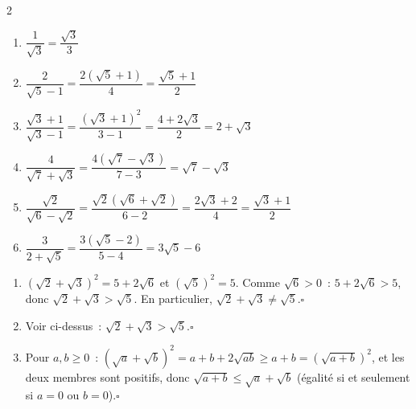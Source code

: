 \begin{multicols}{2}
\begin{enumerate}
  \item $\dfrac{1}{\sqrt{3}}=\dfrac{\sqrt{3}}{3}$
  \item $\dfrac{2}{\sqrt{5}-1}=\dfrac{2(\sqrt{5}+1)}{4}=\dfrac{\sqrt{5}+1}{2}$
  \item $\dfrac{\sqrt{3}+1}{\sqrt{3}-1}=\dfrac{(\sqrt{3}+1)^2}{3-1}=\dfrac{4+2\sqrt{3}}{2}=2+\sqrt{3}$
  \item $\dfrac{4}{\sqrt{7}+\sqrt{3}}=\dfrac{4(\sqrt{7}-\sqrt{3})}{7-3}=\sqrt{7}-\sqrt{3}$
  \item $\dfrac{\sqrt{2}}{\sqrt{6}-\sqrt{2}}=\dfrac{\sqrt{2}(\sqrt{6}+\sqrt{2})}{6-2}=\dfrac{2\sqrt{3}+2}{4}=\dfrac{\sqrt{3}+1}{2}$
  \item $\dfrac{3}{2+\sqrt{5}}=\dfrac{3(\sqrt{5}-2)}{5-4}=3\sqrt{5}-6$
\end{enumerate}
\end{multicols}

\begin{enumerate}
  \item $(\sqrt{2}+\sqrt{3})^2=5+2\sqrt{6}$ et $(\sqrt{5})^2=5$.
        Comme $\sqrt{6}>0$~: $5+2\sqrt{6}>5$, donc $\sqrt{2}+\sqrt{3}>\sqrt{5}$.
        En particulier, $\sqrt{2}+\sqrt{3}\ne\sqrt{5}$.\hfill$\square$
  \item Voir ci-dessus~: $\sqrt{2}+\sqrt{3}>\sqrt{5}$.\hfill$\square$
  \item Pour $a,b\ge0$~: $(\sqrt{a}+\sqrt{b})^2=a+b+2\sqrt{ab}\ge a+b=(\sqrt{a+b})^2$,
        et les deux membres sont positifs, donc $\sqrt{a+b}\le\sqrt{a}+\sqrt{b}$
        (\'egalit\'e si et seulement si $a=0$ ou $b=0$).\hfill$\square$
\end{enumerate}


